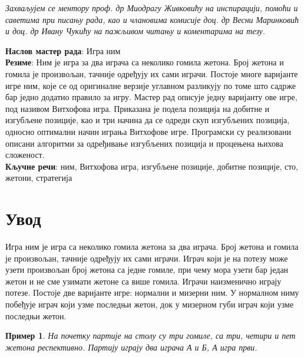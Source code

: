 \documentclass[a4paper]{article}
\newtheorem{example}{Пример}
\begin{document}


\clearpage
{\mbox{}\vspace{15em}
\flushright                       
\Large \emph{Захваљујем се ментору проф. др Миодрагу Живковићу на инспирацији, помоћи и саветима при писању рада, као и члановима комисије доц. др Весни Маринковић и доц. др Ивану Чукићу на пажљивом читању и коментарима на тезу.} \par
\vfill
}

\clearpage
\textbf{Наслов мастер рада}: Игра ним\\

\textbf{Резиме}: Ним је игра за два играча са неколико гомила жетона. Број жетона и гомила је произвољан, тачније одређују их сами играчи. Постоје многе варијанте игре ним, које се од оригиналне верзије углавном разликују по томе што садрже бар једно додатно правило за игру. Мастер рад описује једну варијанту ове игре, под називом Витхофова игра. Приказана је подела позиција на добитне и изгубљене позиције, као и три начина да се одреди скуп изгубљених позиција, односно оптимални начин играња Витхофове игре. Програмски су реализовани описани алгоритми за одређивање изгубљених позиција и процењена њихова сложеност.\\

\textbf{Кључне речи}: ним, Витхофова игра, изгубљене позиције, добитне позиције, сто, жетони, стратегија

\clearpage

\tableofcontents

\newpage
{}

\section{Увод}
\label{sec:uvod}

Игра ним \cite{carls_buton} је игра са неколико гомила жетона за два играча. Број жетона и гомила је произвољан, тачније одређују их сами играчи. Играч који је на потезу може узети произвољан број жетона са једне гомиле, при чему мора узети бар један жетон и не сме узимати жетоне са више гомила. Играчи наизменично играју потезе. Постоје две варијанте игре: нормални и мизерни ним. У нормалном ниму побеђује играч који узме последњи жетон, док у мизерном губи играч који узме последњи жетон.

\begin{example}
На почетку партије на столу су три гомиле, са три, четири и пет жетона респективно. Партију играју два играча \textit{А} и \textit{Б}, \textit{А} игра први. 
\end{example}
\end{document}
